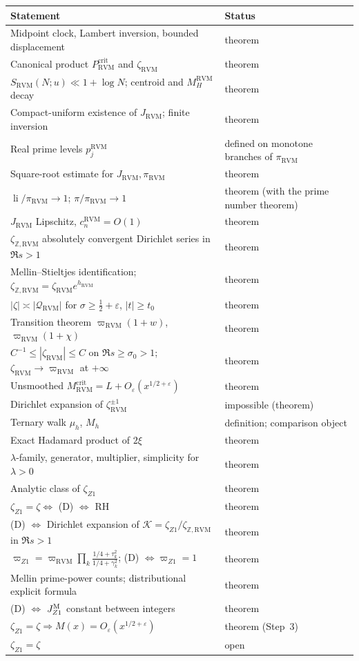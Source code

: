 \documentclass[11pt,reqno]{amsart}
\numberwithin{equation}{section}
\theoremstyle{plain}
\theoremstyle{definition}
\theoremstyle{remark}
\newcommand{\Z}{\mathbb Z}
\newcommand{\eps}{\varepsilon}
\newcommand{\li}{\operatorname{li}}
\newcommand{\RVM}{\mathrm{RVM}}
\newcommand{\crit}{\mathrm{crit}}
\begin{document}
\begin{center}
\small
\begin{tabular}{p{}p{}}
\toprule
Statement & Status\\
\midrule
Midpoint clock, Lambert inversion, bounded displacement & theorem\\
Canonical product $P_{\RVM}^{\crit}$ and $\zeta_{\RVM}$ & theorem\\
$S_{\RVM}(N;u)\ll1+\log N$; centroid and $M_H^{\RVM}$ decay & theorem\\
Compact-uniform existence of $J_{\RVM}$; finite inversion & theorem\\
Real prime levels $p_j^{\RVM}$ & defined on monotone branches of $\pi_{\RVM}$\\
Square-root estimate for $J_{\RVM},\pi_{\RVM}$ & theorem\\
$\li/\pi_{\RVM}\to1$; $\pi/\pi_{\RVM}\to1$ & theorem (with the prime number theorem)\\
$J_{\RVM}$ Lipschitz, $c_n^{\RVM}=O(1)$ & theorem\\
$\zeta_{\Z,\RVM}$ absolutely convergent Dirichlet series in $\Re s>1$ & theorem\\
Mellin--Stieltjes identification; $\zeta_{\Z,\RVM}=\zeta_{\RVM}e^{h_{\RVM}}$ & theorem\\
$|\zeta|\asymp|\mathcal Q_{\RVM}|$ for $\sigma\ge\frac12+\eps$, $|t|\ge t_0$ & theorem\\
Transition theorem $\varpi_{\RVM}(1+w)$, $\varpi_{\RVM}(1+\chi)$ & theorem\\
$C^{-1}\le|\zeta_{\RVM}|\le C$ on $\Re s\ge\sigma_0>1$; $\zeta_{\RVM}\to\varpi_{\RVM}$ at $+\infty$ & theorem\\
Unsmoothed $M_{\RVM}^{\crit}=L+O_\eps(x^{1/2+\eps})$ & theorem\\
Dirichlet expansion of $\zeta_{\RVM}^{\pm1}$ & impossible (theorem)\\
Ternary walk $\mu_h$, $M_h$ & definition; comparison object\\
Exact Hadamard product of $2\xi$ & theorem\\
$\lambda$-family, generator, multiplier, simplicity for $\lambda>0$ & theorem\\
Analytic class of $\zeta_{Z1}$ & theorem\\
$\zeta_{Z1}=\zeta\Leftrightarrow$ (D) $\Leftrightarrow$ RH & theorem\\
(D) $\Leftrightarrow$ Dirichlet expansion of $\mathcal K=\zeta_{Z1}/\zeta_{\Z,\RVM}$ in $\Re s>1$ & theorem\\
$\varpi_{Z1}=\varpi_{\RVM}\prod_k\frac{1/4+\tau_k^2}{1/4+\gamma_k^2}$; (D) $\Leftrightarrow\varpi_{Z1}=1$ & theorem\\
Mellin prime-power counts; distributional explicit formula & theorem\\
(D) $\Leftrightarrow$ $J_{Z1}^{\rm M}$ constant between integers & theorem\\
$\zeta_{Z1}=\zeta\Rightarrow M(x)=O_\eps(x^{1/2+\eps})$ & theorem (Step~3)\\
$\zeta_{Z1}=\zeta$ & open\\
\bottomrule
\end{tabular}
\end{center}
\end{document}
